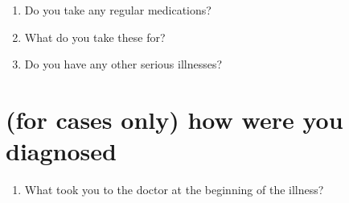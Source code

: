 \documentclass[a4paper,10pt]{article}
\begin{document}
\begin{enumerate}
\item Do you take any regular medications?
\item What do you take these for?
\item Do you have any other serious illnesses?
\end{enumerate}

\section{(for cases only) how were you diagnosed}

\begin{enumerate}
\item What took you to the doctor at the beginning of the illness? 
\end{enumerate}
\end{document}
